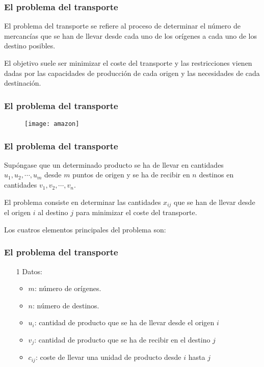 \documentclass{beamer}
\begin{document}
\begin{frame}
\frametitle{El problema del transporte}
El problema del transporte se refiere al proceso de determinar el n\'umero de mercanc\'ias que se han de llevar desde cada uno de los or\'igenes a cada uno de los destino posibles.

El objetivo suele ser minimizar el coste del transporte y las restricciones vienen dadas por las capacidades de producci\'on de cada origen y las necesidades de cada destinaci\'on.

\end{frame}


\begin{frame}
\frametitle{El problema del transporte}
\begin{figure}[h]
\label{fig:volumen}
\centering
\texttt{[image: amazon]}
\end{figure}
\end{frame}

\begin{frame}
\frametitle{El problema del transporte}
Sup\'ongase que un determinado producto se ha de llevar en cantidades $u_1, u_2, \cdots, u_m$ desde $m$ puntos de origen y se ha de recibir en $n$ destinos en cantidades $v_1, v_2, \cdots, v_n$.

El problema consiste en determinar las cantidades $x_{ij}$ que se han de llevar desde el origen $i$ al destino $j$ para minimizar el coste del transporte.

Los cuatros elementos principales del problema son:
\end{frame}

\begin{frame}
\frametitle{El problema del transporte}
\begin{itemize}
\item[1] Datos:
\begin{itemize}
\item $m$: n\'umero de or\'igenes.
\item $n$: n\'umero de destinos.
\item $u_i$: cantidad de producto que se ha de llevar desde el origen $i$
\item $v_j$: cantidad de producto que se ha de recibir en el destino $j$
\item $c_{ij}$: coste de llevar una unidad de producto desde $i$ hasta $j$
\end{itemize}
\end{itemize}
\end{frame}
\end{document}
